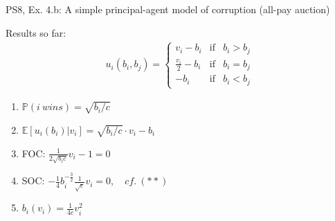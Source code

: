 \begin{frame}{PS8, Ex. 4.b: A simple principal-agent model of corruption (all-pay auction)}
\begin{multicols}{2}
\begin{itemize}
      \end{itemize}
      \vspace{-6pt}
      Results so far: \vspace{-6pt}
      \begin{align*}
        u_i(b_i,b_j)=\left\{\begin{array}{lcl}
          v_i-b_i           & \text{if} & b_i>b_j \\
          \frac{v_i}{2}-b_i & \text{if} & b_i=b_j \\
          -b_i              & \text{if} & b_i<b_j
        \end{array}\right.
      \end{align*} \vspace{-16pt}
      \begin{enumerate}
        \item $\mathbb{P}(i\ wins)=\sqrt{b_i/c}$
        \item $\mathbb{E}[u_i(b_i)|v_i]=\sqrt{b_i/c}\cdot v_i-b_i$
        \item FOC: $\frac{1}{2\sqrt{b_ic}}v_i-1=0$
        \item[] SOC: $-\frac{1}{4}b_i^{-\frac{3}{2}}\frac{1}{\sqrt{c}}v_i=0,\quad cf.\ (**)$
        \item $b_i(v_i)=\frac{1}{4c}v_i^2$
      \end{enumerate}
      \vfill\null
    \end{multicols}
\end{frame}

